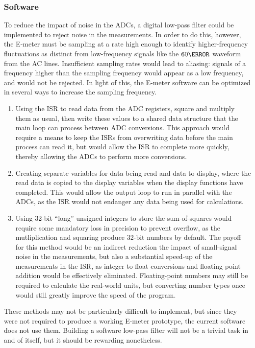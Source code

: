 \subsubsection{Software}
To reduce the impact of noise in the \acp{ADC}, a digital low-pass
filter could be implemented to reject noise in the measurements. In
order to do this, however, the E-meter must be sampling at a rate
high enough to identify higher-frequency fluctuations as distinct from
low-frequency signals like the $60\hertz$ waveform from the \ac{AC}
lines. Insufficient sampling rates would lead to aliasing: signals of
a frequency higher than the sampling frequency would appear as a
low frequency, and would not be rejected. In light of this, the
E-meter software can be optimized in several ways to increase the
sampling frequency.
\begin{enumerate}
  \item Using the \ac{ISR} to read data from the \ac{ADC} registers,
    square and multiply them as usual, then write these values to
    a shared data structure that the main loop can process between
    \ac{ADC} conversions. This approach would require a means to keep
    the \acp{ISR} from overwriting data before the main process can
    read it, but would allow the \ac{ISR} to complete more quickly,
    thereby allowing the \acp{ADC} to perform more conversions.
  \item Creating separate variables for data being read
    and data to display, where the read data is copied to the display
    variables when the display functions have completed. This would
    allow the output loop to run in parallel with the \acp{ADC}, as
    the \ac{ISR} would not endanger any data being used for calculations.
  \item Using 32-bit ``long'' unsigned integers to store the
    sum-of-squares would require some mandatory loss in precision to 
    prevent overflow, as the mutliplication and squaring produce
    32-bit numbers by default. The payoff for this method would be an
    indirect reduction the impact of small-signal noise in the
    measurements, but also a substantial speed-up of the measurements
    in the \ac{ISR}, as integer-to-float conversions and floating-point
    addition would be effectively eliminated. Floating-point numbers
    may still be required to calculate the real-world units, but
    converting number types once would still greatly improve the speed
    of the program.
\end{enumerate}
These methods may not be particularly difficult to implement, but
since they were not required to produce a working E-meter prototype,
the current software does not use them. Building a software low-pass
filter will not be a trivial task in and of itself, but it should be
rewarding nonetheless.


